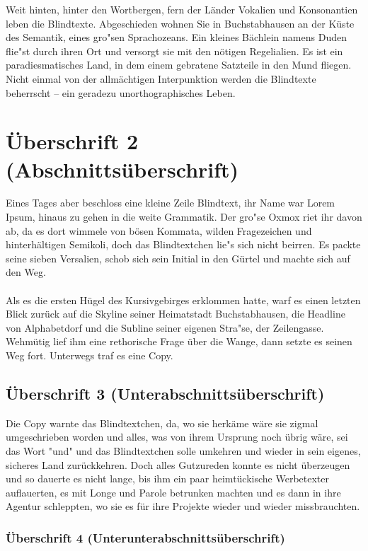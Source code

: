 
Weit hinten, hinter den Wortbergen, fern der Länder Vokalien und Konsonantien leben die Blindtexte. Abgeschieden wohnen Sie in Buchstabhausen an der Küste des Semantik, eines gro"sen Sprachozeans. Ein kleines Bächlein namens Duden flie"st durch ihren Ort und versorgt sie mit den nötigen Regelialien. Es ist ein paradiesmatisches Land, in dem einem gebratene Satzteile in den Mund fliegen. Nicht einmal von der allmächtigen Interpunktion werden die Blindtexte beherrscht – ein geradezu unorthographisches Leben.

\section{Überschrift 2 (Abschnittsüberschrift)}

Eines Tages aber beschloss eine kleine Zeile Blindtext, ihr Name war Lorem Ipsum, hinaus zu gehen in die weite Grammatik. Der gro"se Oxmox riet ihr davon ab, da es dort wimmele von bösen Kommata, wilden Fragezeichen und hinterhältigen Semikoli, doch das Blindtextchen lie"s sich nicht beirren. Es packte seine sieben Versalien, schob sich sein Initial in den Gürtel und machte sich auf den Weg.\\
\\
Als es die ersten Hügel des Kursivgebirges erklommen hatte, warf es einen letzten Blick zurück auf die Skyline seiner Heimatstadt Buchstabhausen, die Headline von Alphabetdorf und die Subline seiner eigenen Stra"se, der Zeilengasse. Wehmütig lief ihm eine rethorische Frage über die Wange, dann setzte es seinen Weg fort. Unterwegs traf es eine Copy.

\subsection{Überschrift 3 (Unterabschnittsüberschrift)}

Die Copy warnte das Blindtextchen, da, wo sie herkäme wäre sie zigmal umgeschrieben worden und alles, was von ihrem Ursprung noch übrig wäre, sei das Wort "und" und das Blindtextchen solle umkehren und wieder in sein eigenes, sicheres Land zurückkehren. Doch alles Gutzureden konnte es nicht überzeugen und so dauerte es nicht lange, bis ihm ein paar heimtückische Werbetexter auflauerten, es mit Longe und Parole betrunken machten und es dann in ihre Agentur schleppten, wo sie es für ihre Projekte wieder und wieder missbrauchten.

\subsubsection{Überschrift 4 (Unterunterabschnittsüberschrift)}

